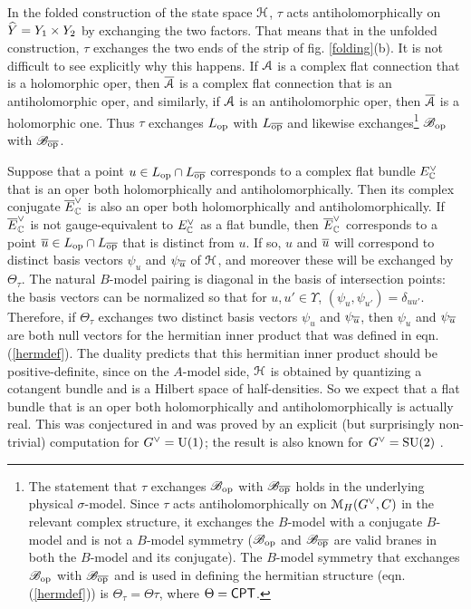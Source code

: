 \documentclass[11pt,a4paper]{article}
\begin{document}
In the folded construction of the state space ${\mathcal H}$, $\tau$ acts antiholomorphically on $\widehat Y=Y_1\times Y_2$ by exchanging the two factors.  That means
that in the unfolded construction, $\tau$ exchanges the two ends of the strip of fig. \ref{folding}(b).   It is not difficult to see explicitly why this happens.
If ${\mathcal A}$ is a complex flat connection that is a holomorphic oper, then $\overline{{\mathcal A}}$ is a complex flat connection 
that is an antiholomorphic oper, and similarly, if ${\mathcal A}$ is an antiholomorphic oper, then $\overline{{\mathcal A}}$ is a holomorphic one.      Thus
$\tau$ exchanges $L_{\mathrm{op}}$ with $L_{\overline{\mathrm{op}}}$ and likewise exchanges\footnote{The statement that $\tau$ exchanges ${\mathscr B}_{\mathrm{op}}$ with ${\mathscr B}_{\overline{\mathrm{op}}}$ holds in the underlying physical
$\sigma$-model.  Since $\tau$ acts antiholomorphically on ${\mathcal M}_H(G^\vee,C)$ in the relevant complex structure, it exchanges the $B$-model with a conjugate
$B$-model  and is not a $B$-model symmetry (${\mathscr B}_{\mathrm{op}}$ and ${\mathscr B}_{\overline{\mathrm{op}}}$ are valid branes in both the $B$-model and its conjugate).   
The $B$-model symmetry that exchanges 
${\mathscr B}_{\mathrm{op}}$ with ${\mathscr B}_{\overline{\mathrm{op}}}$ and is used in defining the hermitian structure (eqn. (\ref{hermdef})) is  $\Theta_\tau=\Theta\tau$, where $\Theta=\sf{CPT}$.}
${\mathscr B}_{\mathrm{op}}$ with ${\mathscr B}_{\overline{\mathrm{op}}}$.

Suppose that a point $u\in L_{\mathrm{op}}\cap L_{\overline{\mathrm{op}}}$ corresponds to a complex flat bundle $E^\vee_{\mathbb C}$  that is an oper both holomorphically and antiholomorphically.   Then
its complex conjugate $\overline E^\vee_{\mathbb C}$  is also an oper both holomorphically and antiholomorphically.   If $\overline E^\vee_{\mathbb C}$  is not gauge-equivalent to $E^\vee_{\mathbb C}$
as a flat bundle, then $\overline E^\vee_{\mathbb C}$ corresponds to a point $\overline u\in L_{\mathrm{op}}\cap L_{\overline{\mathrm{op}}}$ that is distinct from $u$.    If so, $u$ and $\overline u$ will correspond to distinct
basis vectors $\psi_u$ and $\psi_{\overline u}$ of ${\mathcal H}$, and moreover these will be exchanged by $\Theta_\tau$.  The natural $B$-model pairing is diagonal
in the basis of intersection points:  the basis vectors can be normalized so that for $u,u'\in \Upsilon$, $(\psi_u,\psi_{u'})=\delta_{uu'}$.   Therefore, if $\Theta_\tau$
exchanges two distinct basis vectors $\psi_u$ and $\psi_{\overline u}$, then $\psi_u$ and $\psi_{\overline u}$ are both null vectors for the hermitian inner product that was defined
in eqn. (\ref{hermdef}).    The duality predicts that this hermitian inner product should be positive-definite, since on the $A$-model side, ${\mathcal H}$ is obtained by quantizing
a cotangent bundle and is a Hilbert space of half-densities.   So we expect that a flat bundle that is an oper both holomorphically and antiholomorphically is
actually real.   This was conjectured in \cite{EFK,EFK2} and was proved by an explicit (but surprisingly non-trivial) computation for $G^\vee={\mathrm U}(1)$; the result
is also known for $G^\vee={\mathrm{SU}}(2)$ \cite{Fal,Go}.
\end{document}
